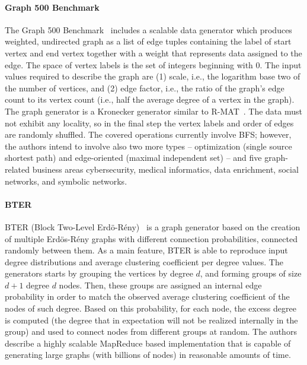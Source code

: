 \paragraph{Graph 500 Benchmark} The Graph 500 Benchmark~\cite{Graph500} includes
a scalable data generator which produces weighted, undirected graph as a list of
edge tuples containing the label of start vertex and end vertex together with a
weight that represents data assigned to the edge. The space of vertex  labels is
the set of integers beginning with 0. The input values required to describe the
graph are (1) scale, i.e., the logarithm base two of the number of vertices, and
(2) edge factor, i.e., the ratio of the graph's edge count to its vertex count
(i.e., half the average degree of a vertex in the graph). The graph generator is
a Kronecker generator similar to R-MAT~\cite{DBLP:conf/sdm/ChakrabartiZF04}. The data must not exhibit any locality,
so in the final step the vertex labels and order of edges are randomly shuffled.
The covered operations currently involve BFS; however, the authors intend to
involve also two more types -- optimization (single source shortest path) and
edge-oriented (maximal independent set) -- and five graph-related business areas
cybersecurity, medical informatics, data enrichment, social networks, and
symbolic networks.

\paragraph{BTER} BTER (Block Two-Level
Erd\"{o}-R\'{e}ny)~\cite{kolda2014scalable} is a graph generator based on the
creation of multiple Erd\"{o}s-R\'{e}ny graphs with different connection
probabilities, connected randomly between them. As a main feature, BTER is able
to reproduce input degree distributions and average clustering
coefficient per degree values. The generators starts by grouping the vertices
by degree $d$, and forming groups of size $d+1$ degree $d$ nodes. Then, these
groups are assigned an internal edge probability in order to match the observed
average clustering coefficient of the nodes of such degree. Based on this
probability, for each node, the excess degree is computed (the degree that in
expectation will not be realized internally in the group) and used to connect
nodes from different groups at random. The authors describe a highly scalable
MapReduce based implementation that is capable of generating large graphs (with
billions of nodes) in reasonable amounts of time.

